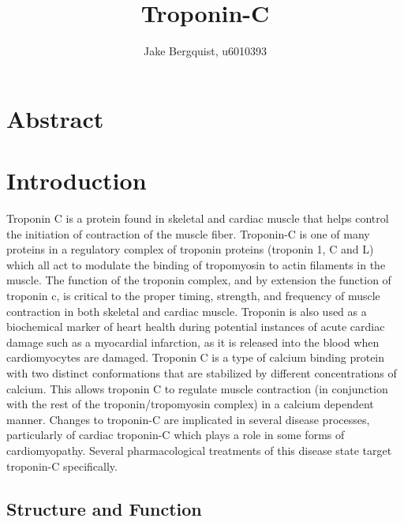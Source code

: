 \documentclass[12pt]{article}
\begin{document}
\title{Troponin-C }
\author{Jake Bergquist, u6010393 }
\maketitle

\section{Abstract}


\section{Introduction}
Troponin C is a protein found in skeletal and cardiac muscle that helps control the initiation of contraction of the muscle fiber. Troponin-C is one of many proteins in a  regulatory complex of troponin proteins (troponin 1, C and L) which all act to modulate the binding of tropomyosin to actin filaments in the muscle. The function of the troponin complex, and by extension the function of troponin c, is critical to the proper timing, strength, and frequency of muscle contraction in both skeletal and cardiac muscle. Troponin is also used as a biochemical marker of heart health during potential instances of acute cardiac damage such as a myocardial infarction, as it is released into the blood when cardiomyocytes are damaged. Troponin C is a type of calcium binding protein with two distinct conformations that are stabilized by different concentrations of calcium. This allows troponin C to regulate muscle contraction (in conjunction with the rest of the troponin/tropomyosin complex) in a calcium dependent manner. Changes to troponin-C are implicated in several disease processes, particularly of cardiac troponin-C which plays a role in some forms of cardiomyopathy. Several pharmacological treatments of this disease state target troponin-C specifically.

\subsection{Structure and Function}
\end{document}

